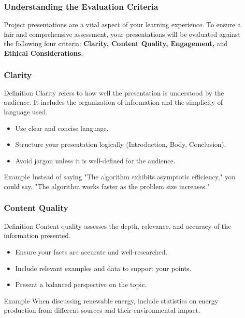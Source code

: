 \documentclass[aspectratio=169]{beamer}
\begin{document}
\begin{frame}[fragile]
    \frametitle{Understanding the Evaluation Criteria}
    Project presentations are a vital aspect of your learning experience. 
    To ensure a fair and comprehensive assessment, your presentations will be evaluated against the following four criteria: 
    \textbf{Clarity, Content Quality, Engagement,} and \textbf{Ethical Considerations}.
\end{frame}

\begin{frame}[fragile]
    \frametitle{Clarity}
    \begin{block}{Definition}
        Clarity refers to how well the presentation is understood by the audience. 
        It includes the organization of information and the simplicity of language used.
    \end{block}
    \begin{itemize}
        \item Use clear and concise language.
        \item Structure your presentation logically (Introduction, Body, Conclusion).
        \item Avoid jargon unless it is well-defined for the audience.
    \end{itemize}
    \begin{block}{Example}
        Instead of saying "The algorithm exhibits asymptotic efficiency," you could say, 
        "The algorithm works faster as the problem size increases."
    \end{block}
\end{frame}

\begin{frame}[fragile]
    \frametitle{Content Quality}
    \begin{block}{Definition}
        Content quality assesses the depth, relevance, and accuracy of the information presented.
    \end{block}
    \begin{itemize}
        \item Ensure your facts are accurate and well-researched.
        \item Include relevant examples and data to support your points.
        \item Present a balanced perspective on the topic.
    \end{itemize}
    \begin{block}{Example}
        When discussing renewable energy, include statistics on energy production from different sources and their environmental impact.
    \end{block}
\end{frame}
\end{document}
